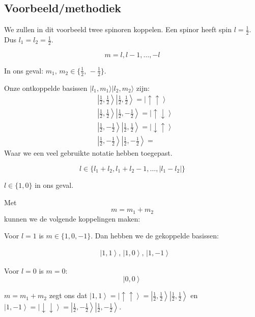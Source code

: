 \subsection{Voorbeeld/methodiek}

We zullen in dit voorbeeld twee spinoren koppelen.
Een spinor heeft spin \(l = \frac{1}{2}\).
Dus \(l_1 = l_2 = \frac{1}{2}\). 

\[m = l, l-1, \dots, -l\]

In ons geval: \(m_1, \, m_2 \in \{\frac{1}{2} , \, -\frac{1}{2}\}  \).

Onze ontkoppelde basissen \(| l_1,m_1\rangle | l_2,m_2 \rangle\) zijn:
\[\begin{aligned}
&\left| \frac{1}{2}, \frac{1}{2} \right\rangle \left| \frac{1}{2}, \frac{1}{2} \right\rangle = \left|\uparrow\uparrow\right\rangle \\
&\left| \frac{1}{2}, \frac{1}{2} \right\rangle \left| \frac{1}{2}, -\frac{1}{2} \right\rangle = \left|\uparrow\downarrow\right\rangle \\
&\left| \frac{1}{2}, -\frac{1}{2} \right\rangle \left| \frac{1}{2}, \frac{1}{2} \right\rangle = \left|\downarrow\uparrow\right\rangle \\
&\left| \frac{1}{2}, -\frac{1}{2} \right\rangle \left| \frac{1}{2}, -\frac{1}{2} \right\rangle =
\end{aligned}\]
Waar we een veel gebruikte notatie hebben toegepast.


\[l \in \{l_1 + l_2, l_1 + l_2 - 1, \dots, |l_1 - l_2|\} \]

\(l \in \{1, 0\}\) in ons geval.

Met
\[ m = m_1 + m_2\]
kunnen we de volgende koppelingen maken:

Voor \(l=1\) is \(m \in \{1, 0, -1\}\).
Dan hebben we de gekoppelde basissen:

\[\begin{aligned}
&\left| 1, 1 \right\rangle 
,\,
\left| 1, 0 \right\rangle 
,\,
\left| 1, -1 \right\rangle 
\end{aligned}\]

Voor \(l=0\) is \(m = 0\):
\[\left| 0, 0 \right\rangle  \]    


\( m = m_1 + m_2\) zegt ons dat \(\left| 1, 1 \right\rangle = \left|\uparrow\uparrow\right\rangle = \left|\frac{1}{2}, \frac{1}{2} \right\rangle \left|\frac{1}{2}, \frac{1}{2} \right\rangle\) en \(\left| 1, -1 \right\rangle = \left|\downarrow\downarrow\right\rangle = \left|\frac{1}{2}, -\frac{1}{2} \right\rangle \left|\frac{1}{2}, -\frac{1}{2} \right\rangle\).

